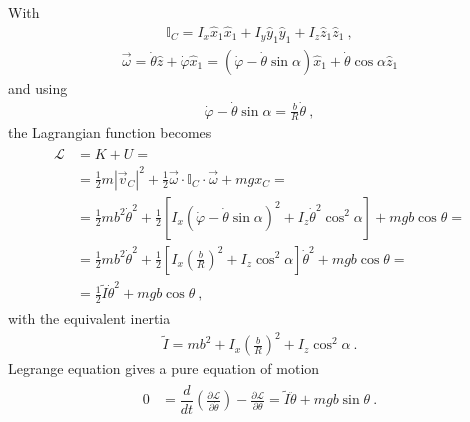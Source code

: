 \documentclass[letterpaper,10pt,english]{jupyterBook}
\begin{document}
\sphinxAtStartPar
With
\begin{equation*}
\begin{split}\mathbb{I}_C = I_{x} \hat{x}_1 \hat{x}_1 + I_{y} \hat{y}_1 \hat{y}_1 + I_{z} \hat{z}_1 \hat{z}_1 \ ,\end{split}
\end{equation*}\begin{equation*}
\begin{split}\vec{\omega} = \dot{\theta} \hat{z} + \dot{\varphi} \hat{x}_1 = \left( \dot{\varphi} - \dot{\theta} \sin \alpha  \right) \hat{x}_1 + \dot{\theta} \cos \alpha \hat{z}_1 \end{split}
\end{equation*}
\sphinxAtStartPar
and using
\begin{equation*}
\begin{split}\dot{\varphi} - \dot{\theta} \sin \alpha = \frac{b}{R} \dot{\theta} \ ,\end{split}
\end{equation*}
\sphinxAtStartPar
the Lagrangian function becomes
\begin{equation*}
\begin{split}\begin{aligned}
  \mathscr{L} & = K + U = \\
  & =\frac{1}{2} m |\vec{v}_C|^2 + \frac{1}{2} \vec{\omega} \cdot \mathbb{I}_C \cdot \vec{\omega} + m g x_C = \\
  & =\frac{1}{2} m b^2 \dot{\theta}^2 + \frac{1}{2} \left[ I_x \left( \dot{\varphi} - \dot{\theta} \sin \alpha \right)^2 + I_z \dot{\theta}^2 \cos^2 \alpha \right] + m g b \cos \theta = \\
  & =\frac{1}{2} m b^2 \dot{\theta}^2 + \frac{1}{2} \left[ I_x \left( \frac{b}{R} \right)^2 + I_z \cos^2 \alpha \right] \dot{\theta}^2 + m g b \cos \theta = \\
  & =\frac{1}{2} \widetilde{I} \dot{\theta}^2 + m g b \cos \theta  \ ,
\end{aligned}\end{split}
\end{equation*}
\sphinxAtStartPar
with the equivalent inertia
\begin{equation*}
\begin{split}\widetilde{I} = m b^2 + I_x \left( \frac{b}{R} \right)^2 + I_z \cos^2 \alpha \ .\end{split}
\end{equation*}
\sphinxAtStartPar
{} Legrange equation gives a pure equation of motion
\begin{equation*}
\begin{split}\begin{aligned}
  0 & = \dfrac{d}{dt}\left( \frac{\partial \mathscr{L}}{\partial \dot{\theta}} \right) - \frac{\partial \mathscr{L}}{\partial \theta} = \widetilde{I} \ddot{\theta} + m g b \sin \theta \ . \\
\end{aligned}\end{split}
\end{equation*}
\sphinxAtStartPar
{}
\end{document}

